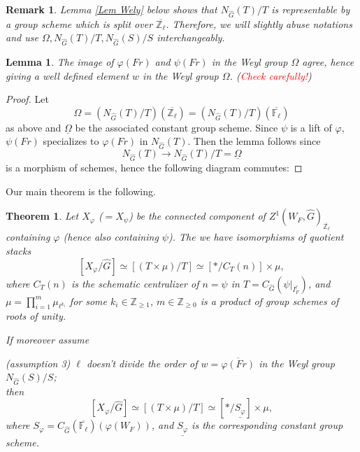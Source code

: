 \documentclass{article}
\newcommand{\red}[1]{\textcolor{red}{#1}}
\newtheorem*{remark}{Remark}
\newtheorem{theorem}{Theorem}
\newtheorem{lemma}{Lemma}
\begin{document}
\begin{remark}
	Lemma \ref{Lem Wely} below shows that $N_{\hat{G}}(T)/T$ is representable by a group scheme which is split over $\overline{\mathbb{Z}_{\ell}}$. Therefore, we will slightly abuse notations and use $\Omega, N_{\hat{G}}(T)/T, N_{\hat{G}}(S)/S$ interchangeably.
\end{remark}

\begin{lemma}
	The image of $\varphi(Fr)$ and $\psi(Fr)$ in the Weyl group $\Omega$ agree, hence giving a well defined element $w$ in the Weyl group $\Omega$. (\red{Check carefully!})
\end{lemma}

\begin{proof}
	Let 
	$$\Omega=\left(N_{\hat{G}}(T)/T\right)(\overline{\mathbb{Z}_{\ell}}) = \left(N_{\hat{G}}(T)/T\right)(\overline{\mathbb{F}_{\ell}})$$ 
	as above and $\underline{\Omega}$ be the associated constant group scheme. Since $\psi$ is a lift of $\varphi$, $\psi(Fr)$ specializes to $\varphi(Fr)$ in $N_{\hat{G}}(T)$. Then the lemma follows since 
	$$N_{\hat{G}}(T) \to N_{\hat{G}}(T)/T=\underline{\Omega}$$
	is a morphism of schemes, hence the following diagram commutes:
	

\end{proof}

Our main theorem is the following.

\begin{theorem}
	Let $X_{\varphi}$ ($= X_{\psi}$) be the connected component of $Z^1(W_F, \hat{G})_{\overline{\mathbb{Z}_{\ell}}}$ containing $\varphi$ (hence also containing $\psi$). The we have isomorphisms of quotient stacks
	$$[X_{\varphi}/\hat{G}] \simeq [(T \times \mu)/T] \simeq [*/{C_T(n)}] \times \mu,$$
	where $C_T(n)$ is the schematic centralizer of $n=\psi$ in $T=C_{\hat{G}}(\psi|_{I_F^{\ell}})$, and $\mu=\prod_{i=1}^m\mu_{\ell^{k_i}}$ for some $k_i \in \mathbb{Z}_{\geq 1}$, $m \in \mathbb{Z}_{\geq 0}$ is a product of group schemes of roots of unity. 
	
	If moreover assume
	\item[(assumption 3)] \label{assumption 3} $\ell$ doesn't divide the order of $w=\overline{\varphi(Fr)}$ in the Weyl group $N_{\hat{G}}(S)/S$;\\
	then 
	$$[X_{\varphi}/\hat{G}] \simeq [(T \times \mu)/T] \simeq [*/\underline{S_{\varphi}}] \times \mu,$$
	where $S_{\varphi}=C_{\hat{G}}(\overline{\mathbb{F}_{\ell}})(\varphi(W_F))$, and $\underline{S_{\varphi}}$ is the corresponding constant group scheme.
\end{theorem}
\end{document}
